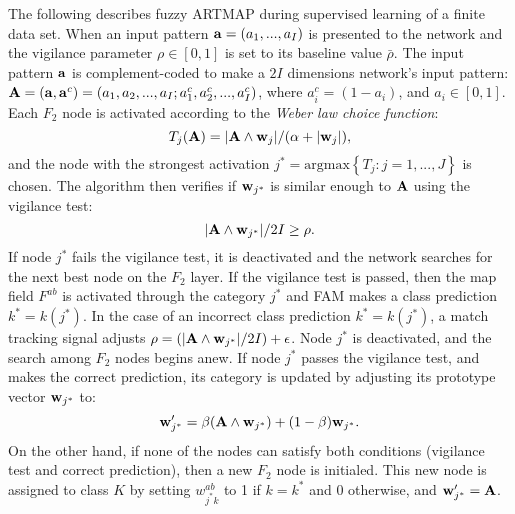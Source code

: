 The following describes fuzzy ARTMAP during supervised learning of a finite data set.
When an input pattern ${\bf a} = (a_1,...,a_I)$ is presented to the network and the vigilance parameter $\rho \in \left[ 0,1 \right]$ is set to its baseline value $\bar{\rho}$. The input pattern ${\bf a}$ is complement-coded to make a $2I$ dimensions network's input pattern: ${\bf A} = ({\bf a},{\bf a}^{c}) = (a_1, a_2, ..., a_I; a^c_1, a^c_2, ..., a^c_I)$, where $a^c_i = (1-a_i)$, and $a_i \in [0,1]$. Each $F_2$ node is activated according to the \emph{Weber law choice function}:
\begin{equation}\label{eq:c3_choice}
	T_j({\bf A}) = |{\bf A} \wedge {\bf w}_j| / (\alpha + |{\bf w}_j|),
\end{equation}  and the node with the strongest activation $j^* = \text{argmax}\left\{T_j:j=1,...,J\right\}$ is chosen.
The algorithm then verifies if ${\bf w}_{j^*}$ is similar enough to ${\bf A}$ using the vigilance test:
\begin{equation}
	|{\bf A} \wedge {\bf w}_{j^*}| / 2I \geq \rho.
\end{equation}
If node $j^*$ fails the vigilance test, it is deactivated and the network searches for the next best node on the $F_2$ layer.
If the vigilance test is passed, then the map field $F^{ab}$ is activated through the category $j^*$ and FAM makes a class prediction $k^* = k(j^*)$.
In the case of an incorrect class prediction $k^*=k(j^*)$, a match tracking signal adjusts $\rho = \left(|{\bf A} \wedge {\bf w}_{j^*}| / 2I\right)+ \epsilon$. Node $j^*$ is deactivated, and the search among $F_2$ nodes begins anew. If node $j^*$ passes the vigilance test, and makes the correct prediction, its category is updated by adjusting its prototype vector ${\bf w}_{j^*}$ to:
\begin{equation}
{\bf w}_{j^*}' = \beta({\bf A} \wedge {\bf w}_{j^*}) + (1 - \beta){\bf w}_{j^*}.
\end{equation}
On the other hand, if none of the nodes can satisfy both conditions (vigilance test and correct prediction), then a new $F_2$ node is initialed. This new node is assigned to class $K$ by setting $w^{ab}_{j^*k}$ to 1 if $k=k^*$ and 0 otherwise, and ${\bf w}_{j^*}'=\textbf{A}$.

